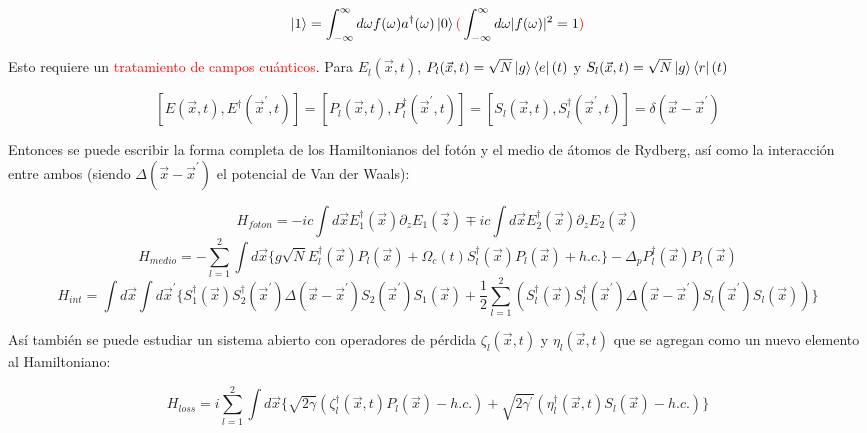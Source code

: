 \documentclass{book}
\begin{document}
\begin{equation}\label{eq11.27}\ket{1}=\int_{-\infty}^\infty d\omega f(\omega)a^\dag(\omega) \ket{0} \textcolor{red}{(}\int_{-\infty}^\infty d\omega \lvert f(\omega)\rvert^2=1\textcolor{red}{)}\end{equation}

Esto requiere un \textcolor{red}{tratamiento de campos cuánticos}. Para $E_l(\vec{x},t)$, $P_l(\vec{x},t)=\sqrt{N}\ket{g}\bra{e}(t)$ y $S_l(\vec{x},t)=\sqrt{N}\ket{g}\bra{r}(t)$

\begin{equation}\label{eq11.28}[E(\vec{x},t),E^\dag(\vec{x}^\prime,t)]=[P_l(\vec{x},t),P_l^\dag(\vec{x}^\prime,t)]=[S_l(\vec{x},t),S_l^\dag(\vec{x}^\prime,t)]=\delta(\vec{x}-\vec{x}^\prime)\end{equation}

Entonces se puede escribir la forma completa de los Hamiltonianos del fotón y el medio de átomos de Rydberg, así como la interacción entre ambos (siendo $\Delta(\vec{x}-\vec{x}^\prime)$ el potencial de Van der Waals):

\begin{equation}\label{eq11.29}H_{foton}=-ic\int d\vec{x}E_1^\dag(\vec{x})\partial_z E_1(\vec{z})\mp ic\int d\vec{x}E_2^\dag(\vec{x})\partial_z E_2(\vec{x})\end{equation}
\begin{equation}\label{eq11.30}H_{medio}=-\sum_{l=1}^2\int d\vec{x}\{g\sqrt{N}E_l^\dag(\vec{x})P_l(\vec{x})+\Omega_c(t)S_l^\dag(\vec{x})P_l(\vec{x})+h.c.\}-\Delta_pP_l^\dag(\vec{x})P_l(\vec{x})\end{equation}
\begin{equation}\label{eq11.31}H_{int}=\int d\vec{x}\int d\vec{x}^\prime \{S_1^\dag(\vec{x})S_2^\dag(\vec{x}^\prime)\Delta(\vec{x}-\vec{x}^\prime)S_2(\vec{x}^\prime)S_1(\vec{x})+\frac{1}{2}\sum_{l=1}^2(S_l^\dag(\vec{x})S_l^\dag(\vec{x}^\prime)\Delta(\vec{x}-\vec{x}^\prime)S_l(\vec{x}^\prime)S_l(\vec{x}))\}\end{equation}

Así también se puede estudiar un sistema abierto con operadores de pérdida $\zeta_l(\vec{x},t)$ y $\eta_l(\vec{x},t)$ que se agregan como un nuevo elemento al Hamiltoniano:

\begin{equation}\label{eq11.32}H_{loss}=i\sum_{l=1}^2\int d\vec{x} \{\sqrt{2\gamma}(\zeta^\dag_l(\vec{x},t)P_l(\vec{x})-h.c.)+\sqrt{2\gamma^\prime}(\eta^\dag_l(\vec{x},t)S_l(\vec{x})-h.c.)\}\end{equation}
\end{document}
